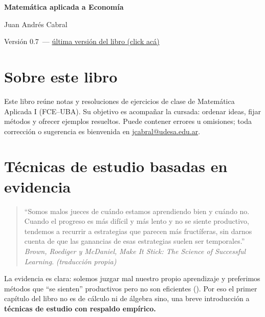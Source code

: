 \documentclass{article}
\renewcommand{\contentsname}{Contenido}%
\newcommand{\version}{0.7}
\begin{document}
\begin{titlepage}
    \centering
    \vspace*{2cm}
    {\Huge\bfseries\color{teal} Matemática aplicada a Economía\par}
    \vspace{0.5cm}
    {\Large\bfseries \par}
    \vspace{2cm}
    {\large Juan Andrés Cabral\par}
    \vfill
{\normalsize Versión \version\ — \href{https://cabraljuan.github.io/matematica%20aplicada/matematica%20aplicada%201.pdf}{última versión del libro (click acá)}\par}
    \thispagestyle{empty}
\end{titlepage}

\section*{Sobre este libro}

Este libro reúne notas y resoluciones de ejercicios de clase de Matemática Aplicada I (FCE–UBA). Su objetivo es acompañar la cursada: ordenar ideas, fijar métodos y ofrecer ejemplos resueltos. Puede contener errores u omisiones; toda corrección o sugerencia es bienvenida en \url{jcabral@udesa.edu.ar}.
\newpage


\renewcommand{\contentsname}{Índice}
\tableofcontents
\newpage






\section{Técnicas de estudio basadas en evidencia}


\begin{quote}
``Somos malos jueces de cuándo estamos aprendiendo bien y cuándo no. Cuando el progreso es más difícil y más lento y no se siente productivo, tendemos a recurrir a estrategias que parecen más fructíferas, sin darnos cuenta de que las ganancias de esas estrategias suelen ser temporales.''\\
\emph{Brown, Roediger y McDaniel,} \textit{Make It Stick: The Science of Successful Learning}. \textit{(traducción propia)}
\end{quote}

La evidencia es clara: solemos juzgar mal nuestro propio aprendizaje y preferimos métodos que “se sienten” productivos pero no son eficientes (\cite{Brown2014MakeItStick}). Por eso el primer capítulo del libro no es de cálculo ni de álgebra sino, una breve introducción a \textbf{\color{teal}técnicas de estudio con respaldo empírico.}
\end{document}

